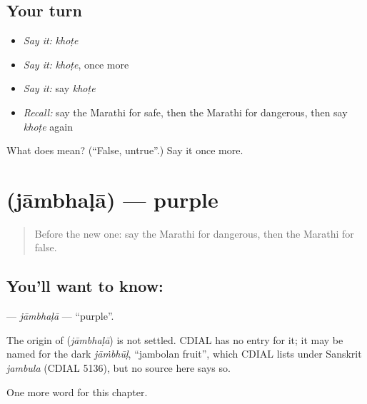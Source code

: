 \subsection*{Your turn}
\begin{itemize}
\raggedright
  \item \emph{Say it:} \emph{khoṭe}
  \item \emph{Say it:} \emph{khoṭe}, once more
  \item \emph{Say it:} say \emph{khoṭe}
  \item \emph{Recall:} say the Marathi for safe, then the Marathi for dangerous, then say \emph{khoṭe} again
\end{itemize}

\begin{tcolorbox}[breakable,colback=teal!4,colframe=teal!35!black,title={Before you move on}]
What does  mean? (\textquotedblleft{}False, untrue\textquotedblright{}.) Say it once more.
\end{tcolorbox}
\section[\texorpdfstring{\mr{जांभळा} (jāmbhaḷā)}{जांभळा (jāmbhaḷā)}]{ (jāmbhaḷā) — purple}

\label{lesson:MR-C152-jambhala}



\begin{quote}
Before the new one: say the Marathi for dangerous, then the Marathi for false.
\end{quote}

\subsection*{You'll want to know: }
\textbf{} — \emph{jāmbhaḷā} — \textquotedblleft{}purple\textquotedblright{}.

\begin{cousinweb}
The origin of \textbf{} (\emph{jāmbhaḷā}) is not settled. CDIAL has no entry for it; it may be named for the dark \emph{jāṁbhūḷ}, \textquotedblleft{}jambolan fruit\textquotedblright{}, which CDIAL lists under Sanskrit \emph{jambula} (CDIAL 5136), but no source here says so.
\end{cousinweb}

\begin{grammarlens}[title={What you've built}]
One more word for this chapter.
\end{grammarlens}

